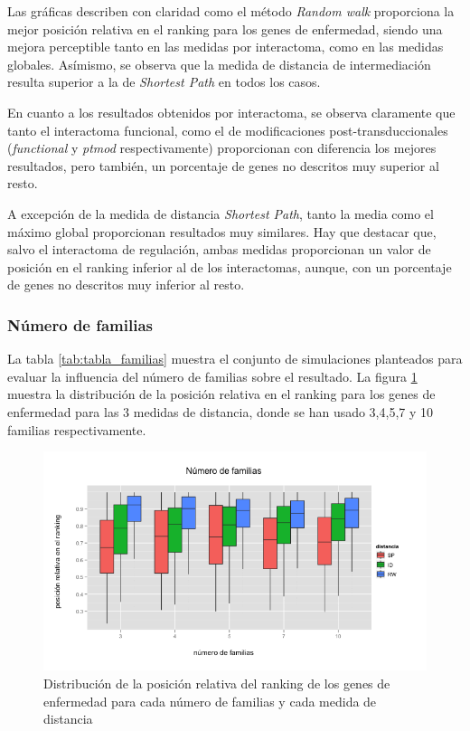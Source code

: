 \medskip
Las gráficas describen con claridad como el método \emph{Random walk} proporciona la mejor posición relativa en el ranking para los genes de enfermedad, siendo una mejora perceptible tanto en las medidas por interactoma, como en las medidas globales. Asímismo, se observa que la medida de distancia de intermediación resulta superior a la de \emph{Shortest Path} en todos los casos.

\medskip
En cuanto a los resultados obtenidos por interactoma, se observa claramente que tanto el interactoma funcional, como el de modificaciones post-transduccionales (\emph{functional} y \emph{ptmod} respectivamente) proporcionan con diferencia los mejores resultados, pero también, un porcentaje de genes no descritos muy superior al resto. 

\medskip
A excepción de la medida de distancia \emph{Shortest Path}, tanto la media como el máximo global proporcionan resultados muy similares. Hay que destacar que, salvo el interactoma de regulación, ambas medidas proporcionan un valor de posición en el ranking inferior al de los interactomas, aunque, con un porcentaje de genes no descritos muy inferior al resto.

\subsubsection{Número de familias}

La tabla \ref{tab:tabla_familias} muestra el conjunto de simulaciones planteados para evaluar la influencia del número de familias sobre el resultado. La figura \ref{fig:familias} muestra la distribución de la posición relativa en el ranking para los genes de enfermedad para las 3 medidas de distancia, donde se han usado 3,4,5,7 y 10 familias respectivamente. 

\begin{figure}[H]
\centering
\includegraphics[scale=0.5]{images/tabla_familias.png}
\caption{Distribución de la posición relativa del ranking de los genes de enfermedad para cada número de familias y cada medida de distancia}
\label{fig:familias}
\end{figure}

